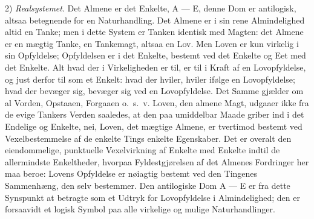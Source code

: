 \documentclass[12pt]{book}
\begin{document}
2) \emph{Realsystemet}. Det Almene er det Enkelte, A --- E, denne Dom er antilogisk, altsaa
betegnende for en Naturhandling. Det Almene er i sin rene Almindelighed altid en Tanke; men i dette
System er Tanken identisk med Magten: det Almene er en mægtig Tanke, en Tankemagt, altsaa en Lov.
Men Loven er kun virkelig i sin Opfyldelse; Opfyldelsen er i det Enkelte, bestemt ved det Enkelte og
Eet med det Enkelte. Alt hvad der i Virkeligheden er til, er til i Kraft af en Lovopfyldelse, og
just derfor til som et Enkelt: hvad der hviler, hviler ifølge en Lovopfyldelse; hvad der bevæger
sig, bevæger sig ved en Lovopfyldelse. Det Samme gjælder om al Vorden, Opstaaen, Forgaaen o.\ s.\ v.
Loven, den almene Magt, udgaaer ikke fra de evige Tankers Verden saaledes, at den paa umiddelbar
Maade griber ind i det Endelige og Enkelte, nei, Loven, det mægtige Almene, er tvertimod bestemt ved
Vexelbestemmelse af de enkelte Tings enkelte Egenskaber. Det er overalt den eiendommelige,
punktuelle Vexelvirkning af Enkelte med Enkelte indtil de allermindste Enkeltheder, hvorpaa
Fyldestgjørelsen af det Almenes Fordringer her maa beroe: Lovens Opfyldelse er nøiagtig bestemt ved
den Tingenes Sammenhæng, den selv bestemmer. Den antilogiske Dom A --- E er fra dette Synspunkt at
betragte som et Udtryk for Lovopfyldelse i Almindelighed; den er forsaavidt et logisk Symbol paa
alle virkelige og mulige Naturhandlinger.
\end{document}
